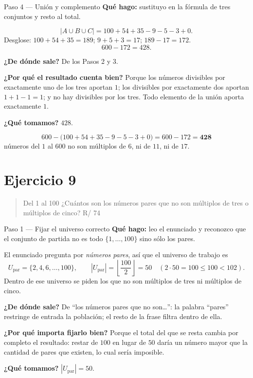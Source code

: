\documentclass[11pt]{article}
\begin{document}
\begin{paso}{Paso 4 --- Unión y complemento}
\textbf{Qué hago:} sustituyo en la fórmula de tres conjuntos y resto al total.

\[
|A\cup B\cup C| = 100+54+35 - 9 - 5 - 3 + 0 .
\]
Desglose: $100+54+35 = 189$; $9+5+3 = 17$; $189-17 = 172$.
\[
600 - 172 = 428 .
\]

\textbf{¿De dónde sale?} De los Pasos 2 y 3.

\textbf{¿Por qué el resultado cuenta bien?} Porque los números divisibles por exactamente uno de los tres aportan $1$; los divisibles por exactamente dos aportan $1+1-1=1$; y no hay divisibles por los tres. Todo elemento de la unión aporta exactamente $1$.

\textbf{¿Qué tomamos?} $428$.
\end{paso}

\begin{resp}
\[
600 - \bigl(100+54+35-9-5-3+0\bigr) = 600-172 = \mathbf{428}
\]
números del $1$ al $600$ no son múltiplos de $6$, ni de $11$, ni de $17$.
\end{resp}

\section*{Ejercicio 9}

\begin{quote}
Del 1 al 100 ¿Cuántos son los números pares que no son múltiplos de tres o múltiplos de cinco? \hfill R/ 74
\end{quote}

\begin{paso}{Paso 1 --- Fijar el universo correcto}
\textbf{Qué hago:} leo el enunciado y reconozco que el conjunto de partida no es todo $\{1,\dots,100\}$ sino sólo los pares.

El enunciado pregunta por \emph{números pares}, así que el universo de trabajo es
\[
U_{\text{par}} = \{2,4,6,\dots,100\},\qquad |U_{\text{par}}| = \left\lfloor \frac{100}{2}\right\rfloor = 50 \quad (2\cdot 50 = 100\le 100 < 102).
\]
Dentro de ese universo se piden los que no son múltiplos de tres ni múltiplos de cinco.

\textbf{¿De dónde sale?} De ``los números pares que no son\dots'': la palabra ``pares'' restringe de entrada la población; el resto de la frase filtra dentro de ella.

\textbf{¿Por qué importa fijarlo bien?} Porque el total del que se resta cambia por completo el resultado: restar de $100$ en lugar de $50$ daría un número mayor que la cantidad de pares que existen, lo cual sería imposible.

\textbf{¿Qué tomamos?} $|U_{\text{par}}| = 50$.
\end{paso}
\end{document}
